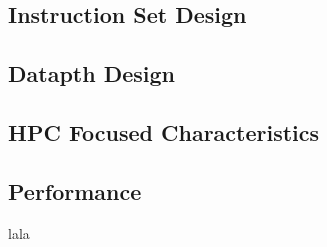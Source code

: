\documentclass[draftclsnofoot, onecolumn, 10pt, compsoc]{IEEEtran}
\begin{document}
        \subsection{Instruction Set Design}
            
        \subsection{Datapth Design}
            
        \subsection{HPC Focused Characteristics}
           
        \subsection{Performance}
            lala
        

    \newpage           
    
    
    
\end{document}

